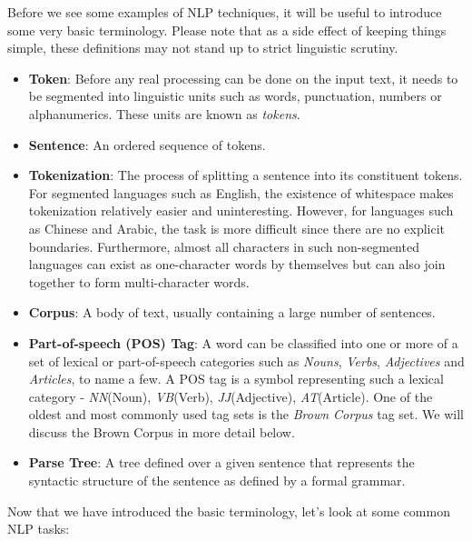 \documentclass[11pt]{article}
\begin{document}
Before we see some examples of NLP techniques, it will be useful to introduce some very basic terminology. Please note that as a side effect of keeping things simple, these definitions may not stand up to strict linguistic scrutiny.
\begin{itemize}
	\item \textbf{Token}: Before any real processing can be done on the input text, it needs to be segmented into linguistic units such as words, punctuation, numbers or alphanumerics. These units are known as \emph{tokens}.
	\item \textbf{Sentence}: An ordered sequence of tokens.
	\item \textbf{Tokenization}: The process of splitting a sentence into its constituent tokens. For segmented languages such as English, the existence of whitespace makes tokenization relatively easier and uninteresting. However, for languages such as Chinese and Arabic, the task is more difficult since there are no explicit boundaries. Furthermore, almost all characters in such non-segmented languages can exist as one-character words by themselves but can also join together to form multi-character words.
	\item \textbf{Corpus}: A body of text, usually containing a large number of sentences.
	\item \textbf{Part-of-speech (POS) Tag}: A word can be classified into one or more of a set of lexical or part-of-speech categories such as \emph{Nouns}, \emph{Verbs}, \emph{Adjectives} and \emph{Articles}, to name a few. A POS tag is a symbol representing such a lexical category -  \emph{NN}(Noun), \emph{VB}(Verb), \emph{JJ}(Adjective), \emph{AT}(Article). One of the oldest and most commonly used tag sets is the \emph{Brown Corpus} tag set. We will discuss the Brown Corpus in more detail below.
	\item \textbf{Parse Tree}: A tree defined over a given sentence that represents the syntactic structure of the sentence as defined by a formal grammar.
\end{itemize}
Now that we have introduced the basic terminology, let's look at some common NLP tasks:
\end{document}
